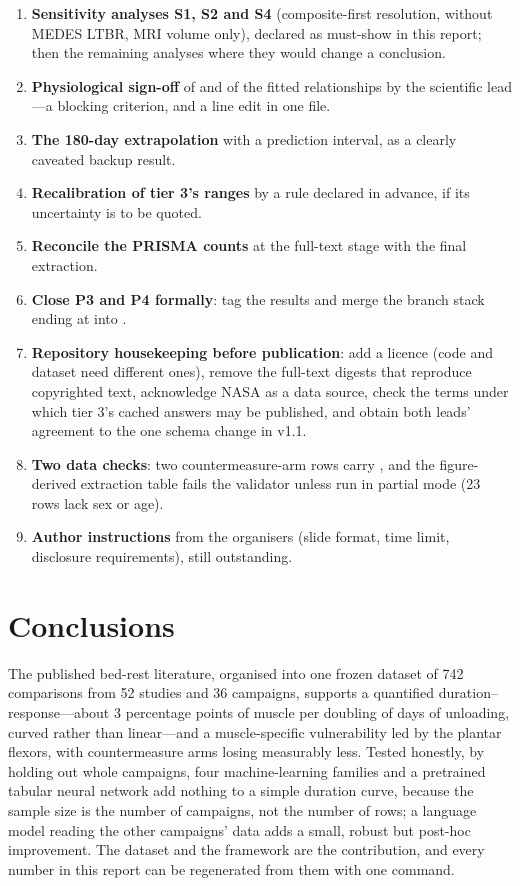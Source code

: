 \begin{enumerate}
  \item \textbf{Sensitivity analyses S1, S2 and S4} (composite-first resolution, without MEDES LTBR, MRI volume only),
        declared as must-show in this report; then the remaining analyses where they would change a conclusion.
  \item \textbf{Physiological sign-off} of  and of the fitted relationships by the
        scientific lead---a blocking criterion, and a line edit in one file.
  \item \textbf{The 180-day extrapolation} with a prediction interval, as a clearly caveated backup result.
  \item \textbf{Recalibration of tier 3's ranges} by a rule declared in advance, if its uncertainty is to be quoted.
  \item \textbf{Reconcile the PRISMA counts} at the full-text stage with the final extraction.
  \item \textbf{Close P3 and P4 formally}: tag the results and merge the branch stack ending at \ReportBranch{} into
        .
  \item \textbf{Repository housekeeping before publication}: add a licence (code and dataset need different ones),
        remove the full-text digests that reproduce copyrighted text, acknowledge NASA as a data source, check the
        terms under which tier 3's cached answers may be published, and obtain both leads' agreement to the one
        schema change in v1.1.
  \item \textbf{Two data checks}: two countermeasure-arm rows carry , and the figure-derived
        extraction table fails the validator unless run in partial mode (23 rows lack sex or age).
  \item \textbf{Author instructions} from the organisers (slide format, time limit, disclosure requirements), still
        outstanding.
\end{enumerate}

\section{Conclusions}
\label{sec:conclusions}

The published bed-rest literature, organised into one frozen dataset of 742 comparisons from 52 studies and 36
campaigns, supports a quantified duration--response---about 3 percentage points of muscle per doubling of days of
unloading, curved rather than linear---and a muscle-specific vulnerability led by the plantar flexors, with
countermeasure arms losing measurably less. Tested honestly, by holding out whole campaigns, four machine-learning
families and a pretrained tabular neural network add nothing to a simple duration curve, because the sample size is the number of campaigns, not the number of
rows; a language model reading the other campaigns' data adds a small, robust but post-hoc improvement. The dataset
and the framework are the contribution, and every number in this report can be regenerated from them with one command.
